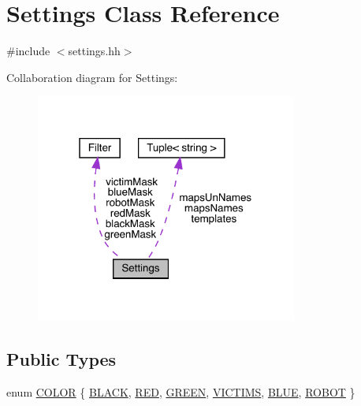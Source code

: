 \hypertarget{class_settings}{}\section{Settings Class Reference}
\label{class_settings}


{\ttfamily \#include $<$settings.\+hh$>$}



Collaboration diagram for Settings\+:
\nopagebreak
\begin{figure}[H]
\begin{center}
\leavevmode
\includegraphics[width=244pt]{class_settings__coll__graph}
\end{center}
\end{figure}
\subsection*{Public Types}
\begin{DoxyCompactItemize}
\item 
enum \mbox{\hyperlink{class_settings_a30d85f2e06a54ae9bc8da2d01037658f}{C\+O\+L\+OR}} \{ \newline
\mbox{\hyperlink{class_settings_a30d85f2e06a54ae9bc8da2d01037658fad72cf235641afa26b82dc5bb8b0db4e1}{B\+L\+A\+CK}}, 
\mbox{\hyperlink{class_settings_a30d85f2e06a54ae9bc8da2d01037658fa164128164b54423f54968a67580a4ce3}{R\+ED}}, 
\mbox{\hyperlink{class_settings_a30d85f2e06a54ae9bc8da2d01037658fa79963b69fcbb589ae6f3f09ac6c5ae90}{G\+R\+E\+EN}}, 
\mbox{\hyperlink{class_settings_a30d85f2e06a54ae9bc8da2d01037658fab4951d8c5bc23e9dab4e9cb53ef3fb26}{V\+I\+C\+T\+I\+MS}}, 
\newline
\mbox{\hyperlink{class_settings_a30d85f2e06a54ae9bc8da2d01037658fa23f16922180d0f5fdc679584f75f83c3}{B\+L\+UE}}, 
\mbox{\hyperlink{class_settings_a30d85f2e06a54ae9bc8da2d01037658fa1cf089d6c6dda465fa704222461f0b28}{R\+O\+B\+OT}}
 \}
\end{DoxyCompactItemize}
